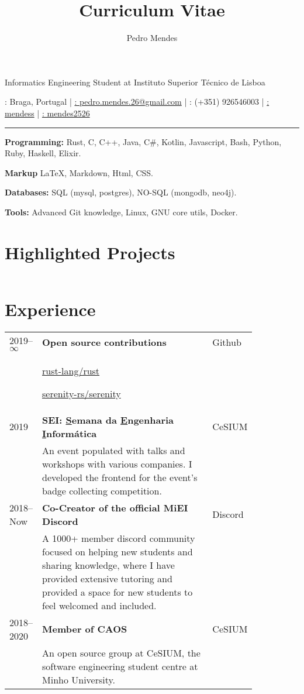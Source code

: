 \documentclass{article}
\makeatletter
\renewcommand{\maketitle}
{
        \begin{center}
            {\huge\bfseries\theauthor}

            \vspace{.25em}

            \Large{Informatics Engineering Student at Instituto Superior Técnico
            de Lisboa}

            \vspace{.25em}

            \large{\thetitle}

            \vspace{.25em}

            \faMapMarker: Braga, Portugal |
            \href{mailto:pedro.mendes.26@gmail.com}{\faEnvelope:
            pedro.mendes.26@gmail.com} |
            \faPhone: (+351) 926546003 |
            \href{https://github.com/mendess}{\faGithub: mendess} |
            \href{https://www.linkedin.com/in/mendes2526/}{\faLinkedinSquare: mendes2526}

        \end{center}
}
\makeatother
\begin{document}
\title{Curriculum Vitae}
\author{Pedro Mendes}

\maketitle

\hrule

\begin{multicols}{2}
    \textbf{Programming:} Rust, C, C++, Java, C\#, Kotlin, Javascript,
    Bash, Python, Ruby, Haskell, Elixir.

    \textbf{Markup} \LaTeX, Markdown, Html, CSS\@.

    \textbf{Databases:} SQL (mysql, postgres), NO-SQL (mongodb, neo4j).

    \textbf{Tools:} Advanced Git knowledge, Linux, GNU core utils, Docker.

\end{multicols}

\section{Highlighted Projects}

\begin{tabular}{p{0.11\linewidth}p{0.73\linewidth}l}
\end{tabular}

\section{Experience}

\begin{tabular}{p{0.11\linewidth}p{0.73\linewidth}l}
    2019--$\infty$ & \textbf{Open source contributions} & Github\\ &
    \href{https://github.com/rust-lang/rust/pulls?q=author\%3Amendess+}
    {rust-lang/rust}

    \href{https://github.com/serenity-rs/serenity/pulls?q=author\%3Amendess+}
    {serenity-rs/serenity} &\\

    2019 & \textbf{SEI\@: \underline{S}emana da \underline{E}ngenharia
    \underline{I}nformática} & CeSIUM \\
    & An event populated with talks and workshops with various companies. I
    developed the frontend for the event's badge collecting competition. &\\

    2018--Now & \textbf{Co-Creator of the official MiEI
    Discord} & Discord\\
    & A 1000+ member discord community focused on helping new students and
    sharing knowledge, where I have provided extensive tutoring and provided a
    space for new students to feel welcomed and included. &\\

    2018--2020 & \textbf{Member of CAOS} & CeSIUM\\
    & An open source group at CeSIUM, the software engineering student centre at
    Minho University. &\\

\end{tabular}
\end{document}
